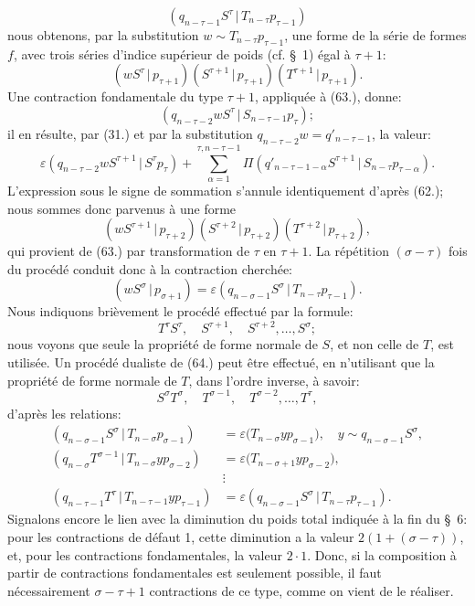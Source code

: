 \documentclass[11pt]{article}
\newcommand{\pair}[2]{(#1\,|\,#2)}
\newcommand{\eps}{\varepsilon}
\begin{document}
\[
 \pair{q_{n-\tau-1}S^\tau}{T_{n-\tau}p_{\tau-1}}
\]
nous obtenons, par la substitution $w\sim T_{n-\tau}p_{\tau-1}$, une forme de la série de formes $f$, avec trois séries d'indice supérieur de poids (cf. \S\ 1) égal à $\tau+1$:
\begin{equation}
 \pair{wS^\tau}{p_{\tau+1}}\pair{S^{\tau+1}}{p_{\tau+1}}\pair{T^{\tau+1}}{p_{\tau+1}}.
\tag{63}
\end{equation}
Une contraction fondamentale du type $\tau+1$, appliquée à (63.), donne:
\[
 \pair{q_{n-\tau-2}wS^\tau}{S_{n-\tau-1}p_\tau};
\]
il en résulte, par (31.) et par la substitution $q_{n-\tau-2}w=q'_{n-\tau-1}$, la valeur:
\[
 \eps\pair{q_{n-\tau-2}wS^{\tau+1}}{S^\tau p_\tau}
 +\sum_{\alpha=1}^{\tau,n-\tau-1}\Pi\pair{q'_{n-\tau-1-\alpha}S^{\tau+1}}{S_{n-\tau}p_{\tau-\alpha}}.
\]
L'expression sous le signe de sommation s'annule identiquement d'après (62.); nous sommes donc parvenus à une forme
\[
 \pair{wS^{\tau+1}}{p_{\tau+2}}\pair{S^{\tau+2}}{p_{\tau+2}}\pair{T^{\tau+2}}{p_{\tau+2}},
\]
qui provient de (63.) par transformation de $\tau$ en $\tau+1$. La répétition $(\sigma-\tau)$ fois du procédé conduit donc à la contraction cherchée:
\[
 \pair{wS^\sigma}{p_{\sigma+1}}=\eps\pair{q_{n-\sigma-1}S^\sigma}{T_{n-\tau}p_{\tau-1}}.
\]
Nous indiquons brièvement le procédé effectué par la formule:
\begin{equation}
 T^\tau S^\tau,\quad S^{\tau+1},\quad S^{\tau+2},\ldots,S^\sigma;
\tag{64}
\end{equation}
nous voyons que seule la propriété de forme normale de $S$, et non celle de $T$, est utilisée. Un procédé dualiste de (64.) peut être effectué, en n'utilisant que la propriété de forme normale de $T$, dans l'ordre inverse, à savoir:
\begin{equation}
 S^\sigma T^\sigma,
\quad T^{\sigma-1},\quad T^{\sigma-2},\ldots,T^\tau,
\tag{65}
\end{equation}
d'après les relations:
\begin{align*}
\pair{q_{n-\sigma-1}S^\sigma}{T_{n-\sigma}p_{\sigma-1}}&=\eps\bigl(T_{n-\sigma}y p_{\sigma-1}\bigr),\quad y\sim q_{n-\sigma-1}S^\sigma,\\
\pair{q_{n-\sigma}T^{\sigma-1}}{T_{n-\sigma}yp_{\sigma-2}}&=\eps\bigl(T_{n-\sigma+1}y p_{\sigma-2}\bigr),\\
&\vdots\\
\pair{q_{n-\tau-1}T^\tau}{T_{n-\tau-1}yp_{\tau-1}}&=\eps\pair{q_{n-\sigma-1}S^\sigma}{T_{n-\tau}p_{\tau-1}}.
\end{align*}
Signalons encore le lien avec la diminution du poids total indiquée à la fin du \S\ 6: pour les contractions de défaut 1, cette diminution a la valeur $2(1+(\sigma-\tau))$, et, pour les contractions fondamentales, la valeur $2\cdot1$. Donc, si la composition à partir de contractions fondamentales est seulement possible, il faut nécessairement $\sigma-\tau+1$ contractions de ce type, comme on vient de le réaliser.
\end{document}
